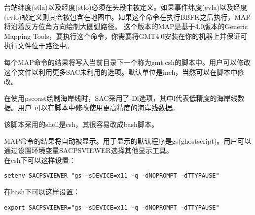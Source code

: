 台站纬度(stla)以及经度(stlo)必须在头段中被定义。如果事件纬度(evla)以及经度(evlo)被定义则其会被包含在地图中。如果这个命令在执行BBFK之后执行，MAP将沿着反方位角方向绘制大圆弧路径。
这个版本的MAP是基于4.0版本的Generic Mapping Tools，要执行这个命令，你需要将GMT4.0安装在你的机器上并保证可执行文件位于路径中。

每个MAP命令的结果将写入当前目录下一个称为gmt.csh的脚本中。用户可以修改这个文件以利用更多SAC未利用的选项。默认单位是inch，当然可以在脚本中修改。

在使用pscoast绘制海岸线时，SAC采用了-Dl选项，其中l代表低精度的海岸线数据。用户
可以在脚本中修改使用更高精度的海岸线数据。

该脚本采用的shell是csh，其很容易改成bash脚本。

MAP命令的结果将自动被显示。用于显示的默认程序是gs(ghostscript)。用户可以通过设置环境变量SACPSVIEWER选择其他显示工具。\\
在csh下可以这样设置：
\begin{lstlisting}[style=Shell]
setenv SACPSVIEWER "gs -sDEVICE=x11 -q -dNOPROMPT -dTTYPAUSE"
\end{lstlisting}

在bash下可以这样设置：
\begin{lstlisting}[style=Shell]
export SACPSVIEWER="gs -sDEVICE=x11 -q -dNOPROMPT -dTTYPAUSE"
\end{lstlisting}
